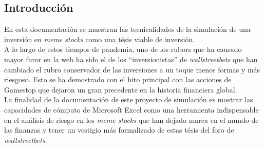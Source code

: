 \documentclass[letterpaper, 12pt]{article}
\begin{document}
    \newpage
    \begin{justify}
        \setcounter{page}{1}
        \section{Introducción}
        \justify
        En esta documentación se muestran las tecnicalidades de la simulación de una inversión en \emph{meme stocks} como una tésis viable de inversión.
        \\\newline
        A lo largo de estos tiempos de pandemia, uno de los rubors que ha causado mayor furor en la web ha sido el de los ``inversionistas'' de \emph{wallstreetbets}
        que han cambiado el rubro conservador de las inversiones a un toque menos formas y más riesgoso. Esto se ha demostrado con el hito principal con las acciones de Gamestop
        que dejaron un gran precedente en la historia financiera global.
        \\\newline
        La finalidad de la documentación de este proyecto de simulación es mostrar las capacidades de cómputo de Microsoft Excel como una herramienta indispensable en el análisis de riesgo
        en los \emph{meme stocks} que han dejado marca en el mundo de las finanzas y tener un vestigio más formalizado de estas tésis del foro de \emph{wallstreetbets}.

\end{justify}
\end{document}
